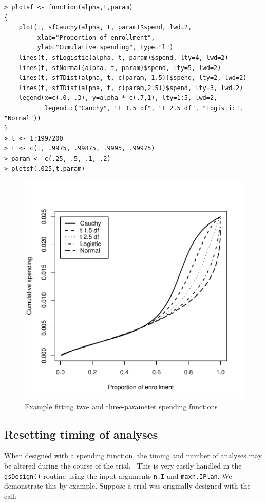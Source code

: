 \bigskip

\begin{verbatim}
> plotsf <- function(alpha,t,param)
{
    plot(t, sfCauchy(alpha, t, param)$spend, lwd=2,
         xlab="Proportion of enrollment",
         ylab="Cumulative spending", type="l")
    lines(t, sfLogistic(alpha, t, param)$spend, lty=4, lwd=2)
    lines(t, sfNormal(alpha, t, param)$spend, lty=5, lwd=2)
    lines(t, sfTDist(alpha, t, c(param, 1.5))$spend, lty=2, lwd=2)
    lines(t, sfTDist(alpha, t, c(param,2.5))$spend, lty=3, lwd=2)
    legend(x=c(.0, .3), y=alpha * c(.7,1), lty=1:5, lwd=2,
           legend=c("Cauchy", "t 1.5 df", "t 2.5 df", "Logistic", "Normal"))
}
> t <- 1:199/200
> t <- c(t, .9975, .99875, .9995, .99975)
> param <- c(.25, .5, .1, .2)
> plotsf(.025,t,param)
\end{verbatim}

\begin{center}%
\begin{figure}
\begin{center}
\includegraphics[width=.6\textwidth]{figs/sfLogistic.pdf}
\end{center}
\caption{Example fitting two- and three-parameter spending functions}
\end{figure}%

\end{center}

\subsection{Resetting timing of analyses\label{sec:reset}}

When designed with a spending function, the timing and number of analyses may
be altered during the course of the trial. \ This is very easily handled in
the \texttt{gsDesign()} routine using the input arguments \texttt{n.I} and
\texttt{maxn.IPlan}. We demonstrate this by example. Suppose a trial was
originally designed with the call:

